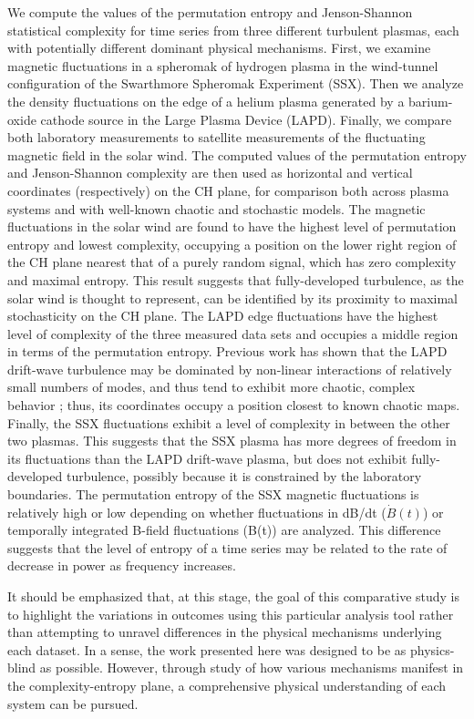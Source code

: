 \documentclass[aps,prx,twocolumn,secnumarabic,nobalancelastpage,amsmath,amssymb,
nofootinbib]{revtex4-1}
\begin{document}
We compute the values of the permutation entropy and Jenson-Shannon statistical complexity for time series from three different turbulent plasmas, each with potentially different dominant physical mechanisms. First, we examine magnetic fluctuations in a spheromak of hydrogen plasma in the wind-tunnel configuration of the Swarthmore Spheromak Experiment (SSX). Then we analyze the density fluctuations on the edge of a helium plasma generated by a barium-oxide cathode source in the Large Plasma Device (LAPD). Finally, we compare both laboratory measurements to satellite measurements of the fluctuating magnetic field in the solar wind. The computed values of the permutation entropy and Jenson-Shannon complexity are then used as horizontal and vertical coordinates (respectively) on the CH plane, for comparison both across plasma systems and with well-known chaotic and stochastic models. The magnetic fluctuations in the solar wind are found to have the highest level of permutation entropy and lowest complexity, occupying a position on the lower right region of the CH plane nearest that of a purely random signal, which has zero complexity and maximal entropy. This result suggests that fully-developed turbulence, as the solar wind is thought to represent, can be identified by its proximity to maximal stochasticity on the CH plane. The LAPD edge fluctuations have the highest level of complexity of the three measured data sets and occupies a middle region in terms of the permutation entropy. Previous work has shown that the LAPD drift-wave turbulence may be dominated by non-linear interactions of relatively small numbers of modes, and thus tend to exhibit more chaotic, complex behavior \cite{pace2008}; thus, its coordinates occupy a position closest to known chaotic maps. Finally, the SSX fluctuations exhibit a level of complexity in between the other two plasmas. This suggests that the SSX plasma has more degrees of freedom in its fluctuations than the LAPD drift-wave plasma, but does not exhibit fully-developed turbulence, possibly because it is constrained by the laboratory boundaries. The permutation entropy of the SSX magnetic fluctuations is relatively high or low depending on whether fluctuations in dB/dt ($\dot{B}(t)$) or temporally integrated B-field fluctuations (B(t)) are analyzed. This difference suggests that the level of entropy of a time series may be related to the rate of decrease in power as frequency increases.

It should be emphasized that, at this stage, the goal of this comparative study is to highlight the variations in outcomes using this particular analysis tool rather than attempting to unravel differences in the physical mechanisms underlying each dataset. In a sense, the work presented here was designed to be as physics-blind as possible. However, through study of how various mechanisms manifest in the complexity-entropy plane, a comprehensive physical understanding of each system can be pursued.
\end{document}
